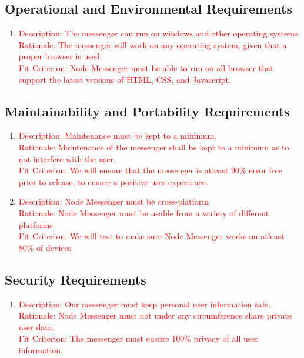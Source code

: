\documentclass[12pt, titlepage]{article}
\begin{document}
    	\subsection{Operational and Environmental Requirements}
    	\begin{enumerate}[label=NFR\arabic*:, resume, leftmargin=1in]
    	\item \textcolor{red}{Description: The messenger can run on windows and other operating systems.  \\
    		  Rationale: The messenger will work on any operating system, given that a proper browser is used. \\
    		  Fit Criterion: Node Messenger must be able to run on all browser that support the latest versions of HTML, CSS, and Javascript.}
    	\end{enumerate}
    	\subsection{Maintainability and Portability Requirements}
    	\begin{enumerate}[label=NFR\arabic*:, resume, leftmargin=1in]
    	\item \textcolor{red}{Description: Maintenance must be kept to a minimum. \\
    		  Rationale: Maintenance of the messenger shall be kept to a minimum as to not interfere with the user. \\
    		  Fit Criterion: We will ensure that the messenger is atleast 90\% error free prior to release, to ensure a positive user experience.}
    	\item \textcolor{red}{Description: Node Messenger must be cross-platform \\
    		  Rationale: Node Messenger must be usable from a variety of different platforms \\
    		  Fit Criterion: We will test to make sure Node Messenger works on atleast 80\% of devices}
    	\end{enumerate}
    	\subsection{Security Requirements}
    	\begin{enumerate}[label=NFR\arabic*:, resume, leftmargin=1in]
    	\item \textcolor{red}{Description: Our messenger must keep personal user information safe. \\
    		  Rationale: Node Messenger must not under any circumference share private user data. \\
    		  Fit Criterion: The messenger must ensure 100\% privacy of all user information. }
    	\end{enumerate}
\end{document}
